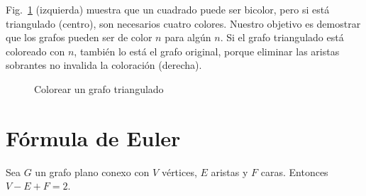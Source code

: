 \begin{example}
Fig.~\ref{f.five-triangular-graph} (izquierda) muestra que un cuadrado puede ser bicolor, pero si está triangulado (centro), son necesarios cuatro colores. Nuestro objetivo es demostrar que los grafos pueden ser de color $n$ para algún $n$. Si el grafo triangulado está coloreado con $n$, también lo está el grafo original, porque eliminar las aristas sobrantes no invalida la coloración (derecha).
\end{example}

\begin{figure}[h]
\begin{center}
\end{center}
\caption{Colorear un grafo triangulado}\label{f.five-triangular-graph}
\end{figure}


\section{Fórmula de Euler}\label{s.euler}

\begin{theorem}\label{thm.euler} Sea $G$ un grafo plano conexo con $V$ vértices, $E$ aristas y $F$ caras. Entonces $V-E+F=2$.
\end{theorem}

